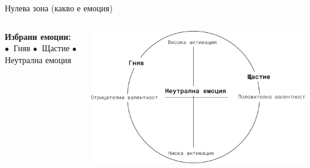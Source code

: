 \documentclass[9pt]{beamer}
\begin{document}
    \begin{frame}{Нулева зона (какво е емоция)}
        \begin{columns}[T] %
            \begin{column}{.38\textwidth}
                \textbf{Избрани емоции:}
                \vspace{1cm} \leavevmode \newline
                $\bullet\ $ Гняв
                \vspace{1cm} \leavevmode \newline
                $\bullet\ $ Щастие
                \vspace{1cm} \leavevmode \newline
                $\bullet\ $ Неутрална емоция
                \vspace{1cm} \leavevmode \newline
                \phantom{$\bullet\ $ Тъга}
            \end{column}%
            \hfill%
            \begin{column}{.60\textwidth}
                \vspace{1cm}
                \begin{center}
                    \includegraphics[width=\textwidth]{valence_arousal_ahn}%
                \end{center}
            \end{column}%
        \end{columns}
    \end{frame}
\end{document}
